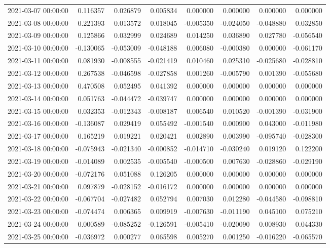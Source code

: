 \begin{tabular}{lrrrrrrr}
2021-03-07 00:00:00 & 0.116357 & 0.026879 & 0.005834 & 0.000000 & 0.000000 & 0.000000 & 0.000000 \\
2021-03-08 00:00:00 & 0.221393 & 0.013572 & 0.018045 & -0.005350 & -0.024050 & -0.048880 & 0.032850 \\
2021-03-09 00:00:00 & 0.125866 & 0.032999 & 0.024689 & 0.014250 & 0.036890 & 0.027780 & -0.056540 \\
2021-03-10 00:00:00 & -0.130065 & -0.053009 & -0.048188 & 0.006080 & -0.000380 & 0.000000 & -0.061170 \\
2021-03-11 00:00:00 & 0.081930 & -0.008555 & -0.021419 & 0.010460 & 0.025310 & -0.025680 & -0.028810 \\
2021-03-12 00:00:00 & 0.267538 & -0.046598 & -0.027858 & 0.001260 & -0.005790 & 0.001390 & -0.055680 \\
2021-03-13 00:00:00 & 0.470508 & 0.052495 & 0.041392 & 0.000000 & 0.000000 & 0.000000 & 0.000000 \\
2021-03-14 00:00:00 & 0.051763 & -0.044472 & -0.039747 & 0.000000 & 0.000000 & 0.000000 & 0.000000 \\
2021-03-15 00:00:00 & 0.032353 & -0.012343 & -0.008187 & 0.006540 & 0.010520 & -0.001390 & -0.031900 \\
2021-03-16 00:00:00 & -0.136087 & 0.029419 & 0.055492 & -0.001540 & 0.000900 & 0.043000 & -0.011980 \\
2021-03-17 00:00:00 & 0.165219 & 0.019221 & 0.020421 & 0.002890 & 0.003990 & -0.095740 & -0.028300 \\
2021-03-18 00:00:00 & -0.075943 & -0.021340 & -0.000852 & -0.014710 & -0.030240 & 0.019120 & 0.122200 \\
2021-03-19 00:00:00 & -0.014089 & 0.002535 & -0.005540 & -0.000500 & 0.007630 & -0.028860 & -0.029190 \\
2021-03-20 00:00:00 & -0.072176 & 0.051088 & 0.126205 & 0.000000 & 0.000000 & 0.000000 & 0.000000 \\
2021-03-21 00:00:00 & 0.097879 & -0.028152 & -0.016172 & 0.000000 & 0.000000 & 0.000000 & 0.000000 \\
2021-03-22 00:00:00 & -0.067704 & -0.027482 & 0.052794 & 0.007030 & 0.012280 & -0.044580 & -0.098810 \\
2021-03-23 00:00:00 & -0.074474 & 0.006365 & 0.009919 & -0.007630 & -0.011190 & 0.045100 & 0.075210 \\
2021-03-24 00:00:00 & 0.000589 & -0.085252 & -0.126591 & -0.005410 & -0.020090 & 0.008930 & 0.044330 \\
2021-03-25 00:00:00 & -0.036972 & 0.000277 & 0.065598 & 0.005270 & 0.001250 & -0.016220 & -0.065570 \\

\end{tabular}
